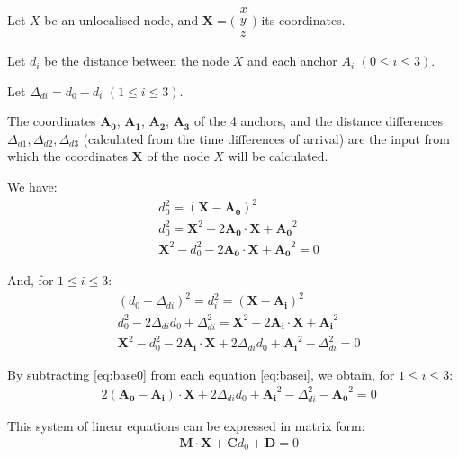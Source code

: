\documentclass[12pt,a4paper,fleqn]{report}
\begin{document}
\begin{appendices}
{Let $X$ be an unlocalised node, and $\mathbf{X} = \bigl( \begin{smallmatrix} x \\ y \\ z \end{smallmatrix} \bigr)$ its coordinates.

Let $d_i$ be the distance between the node $X$ and each anchor $A_i$ $(0 \leq i \leq 3)$.

Let $\Delta_{di} = d_0 - d_i$ $(1 \leq i \leq 3)$.

\medskip

The coordinates $\mathbf{A_0}$, $\mathbf{A_1}$, $\mathbf{A_2}$, $\mathbf{A_3}$ of the 4 anchors, and the distance differences $\Delta_{d1}, \Delta_{d2}, \Delta_{d3}$ (calculated from the time differences of arrival) are the input from which the coordinates $\mathbf{X}$ of the node $X$ will be calculated.

\medskip

We have:
\begin{align}
	& d_0^2 = (\mathbf{X} - \mathbf{A_0})^2 \nonumber \\
	& d_0^2 = \mathbf{X}^2 - 2 \mathbf{A_0} \cdot \mathbf{X} + \mathbf{A_0}^2 \nonumber \\
	& \mathbf{X}^2 - d_0^2 - 2 \mathbf{A_0} \cdot \mathbf{X} + \mathbf{A_0}^2 = 0
	\label{eq:base0}
\end{align}

And, for $1 \leq i \leq 3$:
\begin{align}
	& (d_0 - \Delta_{di})^2 = d_i^2 = (\mathbf{X} - \mathbf{A_i})^2 \nonumber \\
	& d_0^2 - 2 \Delta_{di} d_0 + \Delta_{di}^2 = \mathbf{X}^2 - 2 \mathbf{A_i} \cdot \mathbf{X} + \mathbf{A_i}^2 \nonumber \\
	& \mathbf{X}^2 - d_0^2 - 2 \mathbf{A_i} \cdot \mathbf{X} + 2 \Delta_{di} d_0 + \mathbf{A_i}^2 - \Delta_{di}^2 = 0
	\label{eq:basei}
\end{align}

By subtracting \eqref{eq:base0} from each equation \eqref{eq:basei}, we obtain, for $1 \leq i \leq 3$:
\begin{align}
	& 2 (\mathbf{A_0} - \mathbf{A_i}) \cdot \mathbf{X} + 2 \Delta_{di} d_0 + \mathbf{A_i}^2 - \Delta_{di}^2 - \mathbf{A_0}^2 = 0 \label{eq:basediff}
\end{align}

This system of linear equations can be expressed in matrix form:
\begin{align}
	& \mathbf{M} \cdot \mathbf{X} + \mathbf{C} d_0 + \mathbf{D} = 0 \label{eq:main}
\end{align}

}
\end{appendices}
\end{document}
